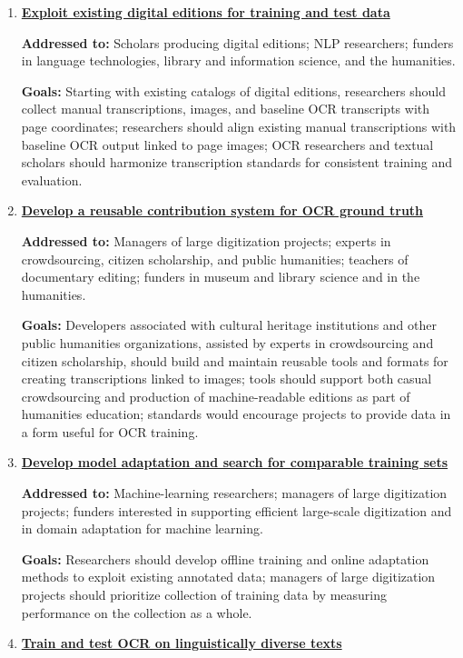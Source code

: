 \documentclass[twoside,11pt]{report}
\begin{document}
\begin{enumerate}
\item \hyperref[sec:rec-editions]{\textbf{Exploit existing digital editions for training and test data}}

\textbf{Addressed to:} Scholars producing digital editions; NLP researchers; funders in language technologies, library and information science, and the humanities.

\textbf{Goals:} Starting with existing catalogs of digital editions, researchers should collect manual transcriptions, images, and baseline OCR transcripts with page coordinates; researchers should align existing manual transcriptions with baseline OCR output linked to page images; OCR researchers and textual scholars should harmonize transcription standards for consistent training and evaluation.

\item \hyperref[sec:rec-contribution]{\textbf{Develop a reusable contribution system for OCR ground truth}}

\textbf{Addressed to:} Managers of large digitization projects; experts in crowdsourcing, citizen scholarship, and public humanities; teachers of documentary editing; funders in museum and library science and in the humanities.

\textbf{Goals:} Developers associated with cultural heritage institutions and other public humanities organizations, assisted by experts in crowdsourcing and citizen scholarship, should build and maintain reusable tools and formats for creating transcriptions linked to images; tools should support both casual crowdsourcing and production of machine-readable editions as part of humanities education; standards would encourage projects to provide data in a form useful for OCR training.

\item \hyperref[sec:rec-adaptation]{\textbf{Develop model adaptation and search for comparable training sets}}

\textbf{Addressed to:} Machine-learning researchers; managers of large digitization projects; funders interested in supporting efficient large-scale digitization and in domain adaptation for machine learning.

\textbf{Goals:} Researchers should develop offline training and online adaptation methods to exploit existing annotated data; managers of large digitization projects should prioritize collection of training data by measuring performance on the collection as a whole.

\item \hyperref[sec:rec-diverse]{\textbf{Train and test OCR on linguistically diverse texts}}


\end{enumerate}
\end{document}
